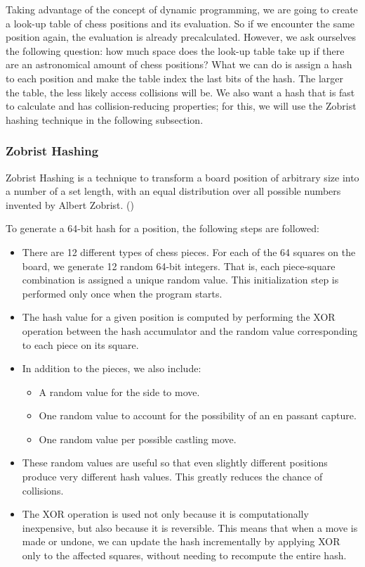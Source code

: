 \vspace{1em}

\noindent Taking advantage of the concept of dynamic programming, we are going to create a look-up table of chess positions and its evaluation. So if we encounter the same position again, the evaluation is already precalculated. However, we ask ourselves the following question: how much space does the look-up table take up if there are an astronomical amount of chess positions? What we can do is assign a hash to each position and make the table index the last bits of the hash. The larger the table, the less likely access collisions will be. We also want a hash that is fast to calculate and has collision-reducing properties; for this, we will use the Zobrist hashing technique in the following subsection.

\vspace{1em}

\subsubsection{Zobrist Hashing}

Zobrist Hashing is a technique to transform a board position of arbitrary size into a number of a set length, with an equal distribution over all possible numbers invented by Albert Zobrist. (\cite{ZobristHashing})

\vspace{1em}

\noindent To generate a 64-bit hash for a position, the following steps are followed:

\begin{itemize}
  \item There are 12 different types of chess pieces. For each of the 64 squares on the board, we generate 12 random 64-bit integers. That is, each piece-square combination is assigned a unique random value. This initialization step is performed only once when the program starts.
  \item The hash value for a given position is computed by performing the XOR operation between the hash accumulator and the random value corresponding to each piece on its square.
  \item In addition to the pieces, we also include:
  \begin{itemize}
    \item A random value for the side to move.
    \item One random value to account for the possibility of an en passant capture.
    \item One random value per possible castling move.
  \end{itemize}
  \item These random values are useful so that even slightly different positions produce very different hash values. This greatly reduces the chance of collisions.
  \item The XOR operation is used not only because it is computationally inexpensive, but also because it is reversible. This means that when a move is made or undone, we can update the hash incrementally by applying XOR only to the affected squares, without needing to recompute the entire hash.
\end{itemize}

